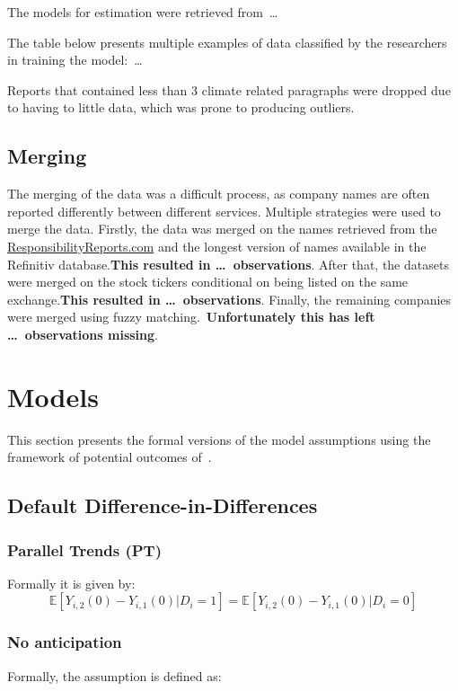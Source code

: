\documentclass[12pt]{article}
\begin{document}
The models for estimation were retrieved from\ \dots

The table below presents multiple examples of data classified by the researchers in training the model:\ \dots 

Reports that contained less than 3 climate related paragraphs were dropped due to having to little data, which was prone to producing outliers.

\subsection{Merging}\label{app:data:merging}

The merging of the data was a difficult process, as company names are often reported differently between different services. Multiple strategies were used to merge the data. Firstly, the data was merged on the names retrieved from the \href{https://responsibilityreports.com}{ResponsibilityReports.com} and the longest version of names available in the Refinitiv database.\@ \textbf{This resulted in \dots\ observations}. After that, the datasets were merged on the stock tickers conditional on being listed on the same exchange.\@ \textbf{This resulted in \dots\ observations}. Finally, the remaining companies were merged using fuzzy matching.\ \textbf{Unfortunately this has left \dots\ observations missing}.

\section{Models}\label{app:models}

This section presents the formal versions of the model assumptions using the framework of potential outcomes of~\textcite{rubinEstimatingCausalEffects1974}.

\subsection{Default Difference-in-Differences}
\subsubsection{Parallel Trends (PT)}

Formally it is given by: 
\begin{equation}
    \mathbb{E}[Y_{i,2}(0) - Y_{i,1}(0) | D_i = 1] = \mathbb{E}[Y_{i,2}(0) - Y_{i,1}(0) | D_i = 0]
\end{equation}

\subsubsection{No anticipation}
Formally, the assumption is defined as:
\end{document}
